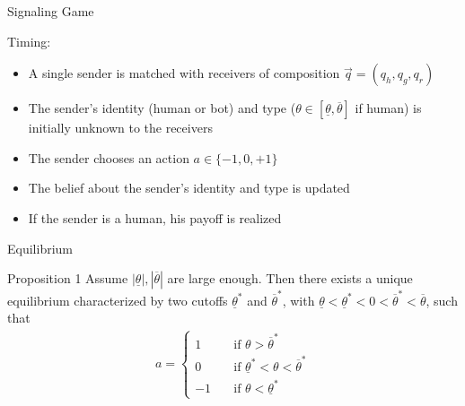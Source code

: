 \documentclass[9pt,aspectratio=1610]{beamer}
\begin{document}
\begin{frame}{Signaling Game}

Timing:
\begin{itemize}\setlength{\itemsep}{1em}
    \item A single sender is matched with receivers of composition $\vec{q} = (q_h,q_g,q_r)$ 
    \item The sender's identity (human or bot) and type ($\theta\in [\underline{\theta},\overline{\theta}]$ if human) is initially unknown to the receivers
    \item The sender chooses an action $a\in \{-1,0,+1\}$
    \item The belief about the sender's identity and type is updated
    \item If the sender is a human, his payoff is realized
\end{itemize}
\end{frame}



\begin{frame}{Equilibrium}
\begin{exampleblock}{Proposition 1}
Assume $|\underline{\theta}|,|\overline{\theta}|$ are large enough. Then there exists a unique equilibrium characterized by two cutoffs $\underline{\theta}^*$ and $\overline{\theta}^*$, with $\underline{\theta}<\underline{\theta}^*<0<\overline{\theta}^*<\overline{\theta}$, such that
\begin{align*}
a=
\begin{cases}
    1\quad &\text{if }\theta>\overline{\theta}^*\\
    0\quad &\text{if }\underline{\theta}^*<\theta<\overline{\theta}^*\\
    -1\quad &\text{if }\theta<\underline{\theta}^*
\end{cases}
\end{align*}    
\end{exampleblock}
\end{frame}
\end{document}
